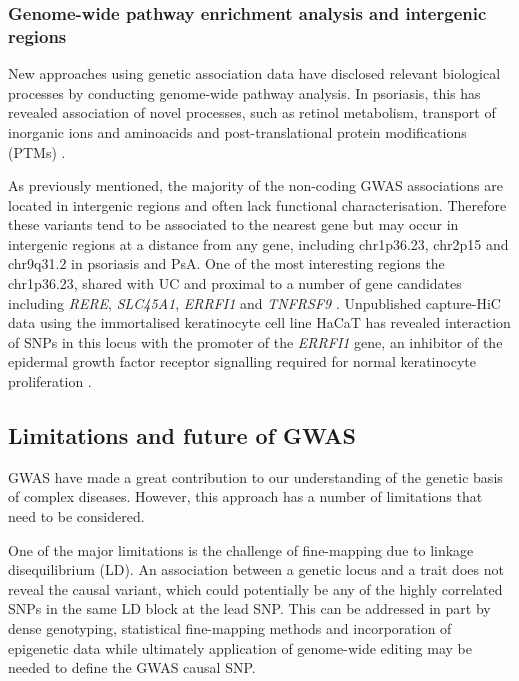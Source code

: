 \subsubsection{Genome-wide pathway enrichment analysis and intergenic regions}

New approaches using genetic association data have disclosed relevant biological processes by conducting genome-wide pathway analysis. %
In psoriasis, this has revealed association of novel processes, such as retinol metabolism, transport of inorganic ions and aminoacids and post-translational protein modifications (PTMs) \parencite{Aterido2015}. 

As previously mentioned, the majority of the non-coding GWAS associations are located in intergenic regions and often lack functional characterisation. Therefore these variants tend to be associated to the nearest gene but may occur in intergenic regions at a distance from any gene, including chr1p36.23, chr2p15 and chr9q31.2 in psoriasis and PsA. One of the most interesting regions the chr1p36.23, shared with UC and proximal to a number of gene candidates including \textit{RERE}, \textit{SLC45A1}, \textit{ERRFI1} and \textit{TNFRSF9} \parencite{Tsoi2012}. Unpublished capture-HiC data using the immortalised keratinocyte cell line HaCaT has revealed interaction of SNPs in this locus with the promoter of the \textit{ERRFI1} gene, an inhibitor of the epidermal growth factor receptor signalling required for normal keratinocyte proliferation \parencite{Ray-Jones2017}. %

 

  

\subsection{Limitations and future of GWAS}

GWAS have made a great contribution to our understanding of the genetic basis of complex diseases. However, this approach has a number of limitations that need to be considered. 

One of the major limitations is the challenge of fine-mapping due to linkage disequilibrium (LD). An association between a genetic locus and a trait does not reveal the causal variant, which could potentially be any of the highly correlated SNPs in the same LD block at the lead SNP. This can be addressed in part by dense genotyping, statistical fine-mapping methods and incorporation of epigenetic data while ultimately application of genome-wide editing may be needed to define the GWAS causal SNP.

